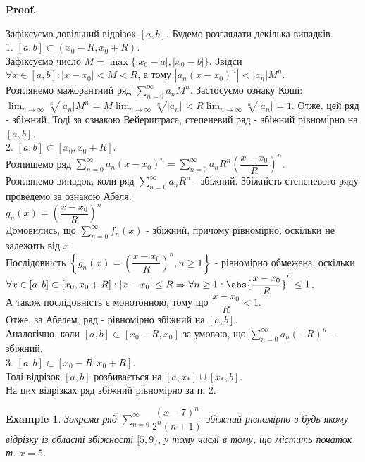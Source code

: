 \documentclass[a4paper, 10pt]{article}
\makeatletter
\def\huge{\displaystyle}
\def\qed{$\blacksquare$}
\theoremstyle{theoremdd}
\theoremstyle{theoremdd}
\theoremstyle{theoremdd}
\theoremstyle{theoremdd}
\theoremstyle{theoremdd}
\newtheorem{example}[theorem]{Example}
\theoremstyle{theoremdd}
\theoremstyle{theoremdd}
\theoremstyle{theoremdd}
\theoremstyle{theoremdd}
\renewenvironment{proof}[1][Proof.\\]{\par
\pushQED{\hfill \qed}%
\normalfont \topsep6\p@\@plus6\p@\relax
\trivlist
\item\relax
{\bfseries
#1\@addpunct{.}}\hspace\labelsep\ignorespaces
}{%
\popQED\endtrivlist\@endpefalse
}
\makeatother
\begin{document}
\begin{proof}
Зафіксуємо довільний відрізок $[a,b]$. Будемо розглядати декілька випадків.\\
1. $[a,b] \subset (x_0-R,x_0+R)$.\\
Зафіксуємо число $M = \max\{|x_0-a|,|x_0-b|\}$. Звідси $\forall x \in [a,b]: |x-x_0| < M < R$, а тому $|a_n(x-x_0)^n| < |a_n| M^n$.\\
Розглянемо мажорантний ряд $\huge \sum_{n=0}^\infty a_n M^n$. Застосуємо ознаку Коші:\\
$\huge \lim_{n \to \infty} \sqrt[n]{|a_n| M^n} = M \lim_{n \to \infty} \sqrt[n]{|a_n|} < R \lim_{n \to \infty} \sqrt[n]{|a_n|} = 1$.
Отже, цей ряд - збіжний. Тоді за ознакою Вейерштраса, степеневий ряд - збіжний рівномірно на $[a,b]$.
\bigskip \\
2. $[a,b] \subset [x_0,x_0+R]$.\\
Розпишемо ряд $\huge \sum_{n=0}^\infty a_n(x-x_0)^n = \sum_{n=0}^\infty a_n R^n \left( \dfrac{x-x_0}{R} \right)^n$.\\
Розглянемо випадок, коли ряд $\huge \sum_{n=0}^\infty a_n R^n$ - збіжний. Збіжність степеневого ряду проведемо за ознакою Абеля:\\
$g_n(x) = \left( \dfrac{x-x_0}{R} \right)^n$\\
Домовились, що $\huge \sum_{n=0}^\infty f_n(x)$ - збіжний, причому рівномірно, оскільки не залежить від $x$.\\
Послідовність $\left\{ g_n(x) = \left( \dfrac{x-x_0}{R} \right)^n, n \geq 1 \right\}$ - рівномірно обмежена, оскільки\\
$\forall x \in [a,b] \subset [x_0, x_0+R]: |x - x_0| \leq R \Rightarrow \forall n \geq 1: \abs{\dfrac{x-x_0}{R}}^n \leq 1$.\\
А також послідовність є монотонною, тому що $\dfrac{x-x_0}{R} < 1$.\\
Отже, за Абелем, ряд - рівномірно збіжний на $[a,b]$.
\bigskip \\
Аналогічно, коли $[a,b] \subset [x_0-R, x_0]$ за умовою, що $\huge \sum_{n=0}^\infty a_n (-R)^n$ - збіжний.
\bigskip \\
3. $[a,b] \subset [x_0-R,x_0+R]$.\\
Тоді відрізок $[a,b]$ розбивається на $[a,x_*] \cup [x_*,b]$. \\ На цих відрізках ряд збіжний рівномірно за п. 2.
\end{proof}

\begin{example}
Зокрема ряд $\huge\sum_{n=0}^\infty \dfrac{(x-7)^n}{2^n (n+1)}$ збіжний рівномірно в будь-якому відрізку із області збіжності $[5,9)$, у тому числі в тому, що містить початок т. $x = 5$.
\end{example}
\end{document}
